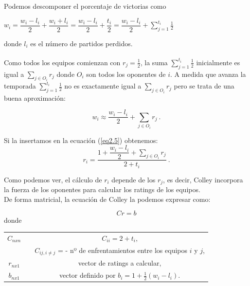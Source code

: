 Podemos descomponer el porcentaje de victorias como
\begin{center} 
	$ w_{i} = \dfrac{w_{i}-l_{i}}{2} + \dfrac{w_{i}+l_{i}}{2} = \dfrac{w_{i}-l_{i}}{2} + \dfrac{t_{i}}{2} = \dfrac{w_{i}-l_{i}}{2} + \sum\limits_{j=1}^{t_{i}} \frac{1}{2} $
\end{center}
donde $l_{i}$ es el número de partidos perdidos.\\
\\
Como todos los equipos comienzan con $r_{j} = \frac{1}{2}$, la suma $\sum\limits_{j=1}^{t_{i}} \frac{1}{2} $ inicialmente es igual a $\sum\limits_{j \in O_{i}} r_{j} $ donde $O_{i}$ son todos los oponentes de $i$.
A medida que avanza la temporada $\sum\limits_{j=1}^{t_{i}} \frac{1}{2} $ no es exactamente igual a $\sum\limits_{j \in O_{i}} r_{j} $ pero se trata de una buena aproximación:
\begin{center}
	\begin{equation}
		w_{i} \approx \dfrac{w_{i}-l_{i}}{2} + \sum\limits_{j \in O_{i}} r_{j} \ .
	\end{equation}
\end{center}

\newpage

Si la insertamos en la ecuación (\ref{eq2.5}) obtenemos:
\begin{equation}
	r_{i} = \dfrac{1+\dfrac{w_{i}-l_{i}}{2} + \sum\limits_{j \in O_{i}} r_{j}}{2+t_{i}} \ .
\end{equation}

Como podemos ver, el cálculo de $r_{i}$ depende de los $r_{j}$, es decir, Colley incorpora la fuerza de los oponentes para calcular los ratings de los equipos.\\

De forma matricial, la ecuación de Colley la podemos expresar como:

\begin{equation} \label{sist_colley}
	Cr = b 
\end{equation}
donde
\begin{center}
	\begin{tabular}{ccc}
		\hline $C_{nxn}$ & & $C_{ii} = 2 + t_{i}$,  \\
		& & $C_{ij, i \neq j}$ = - nº de enfrentamientos entre los equipos $i$ y $j$,\\ 
		\hline  $r_{nx1}$ & & vector de ratings a calcular, \\ 
		\hline  $b_{nx1}$ & & vector definido por $b_{i}=1+\frac{1}{2}(w_{i}-l_{i})$.\\ 
		\hline 
	\end{tabular}
\end{center} 

